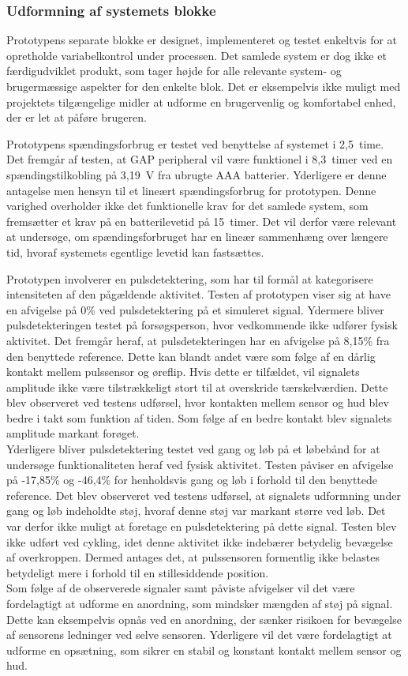 \subsubsection{Udformning af systemets blokke}
Prototypens separate blokke er designet, implementeret og testet enkeltvis for at opretholde variabelkontrol under processen. Det samlede system er dog ikke et færdigudviklet produkt, som tager højde for alle relevante system- og brugermæssige aspekter for den enkelte blok. Det er eksempelvis ikke muligt med projektets tilgængelige midler at udforme en brugervenlig og komfortabel enhed, der er let at påføre brugeren.

Prototypens spændingsforbrug er testet ved benyttelse af systemet i 2,5~time. Det fremgår af testen, at GAP peripheral vil være funktionel i 8,3~timer ved en spændingstilkobling på 3,19~V fra ubrugte AAA batterier. Yderligere er denne antagelse men hensyn til et lineært spændingsforbrug for prototypen. Denne varighed overholder ikke det funktionelle krav for det samlede system, som fremsætter et krav på en batterilevetid på 15~timer. Det vil derfor være relevant at undersøge, om spændingsforbruget har en lineær sammenhæng over længere tid, hvoraf systemets egentlige levetid kan fastsættes. 

Prototypen involverer en pulsdetektering, som har til formål at kategorisere intensiteten af den pågældende aktivitet. Testen af prototypen viser sig at have en afvigelse på 0\% ved pulsdetektering på et simuleret signal. Ydermere bliver pulsdetekteringen testet på forsøgsperson, hvor vedkommende ikke udfører fysisk aktivitet. Det fremgår heraf, at pulsdetekteringen har en afvigelse på 8,15\% fra den benyttede reference. Dette kan blandt andet være som følge af en dårlig kontakt mellem pulssensor og øreflip. Hvis dette er tilfældet, vil signalets amplitude ikke være tilstrækkeligt stort til at overskride tærskelværdien. Dette blev observeret ved testens udførsel, hvor kontakten mellem sensor og hud blev bedre i takt som funktion af tiden. Som følge af en bedre kontakt blev signalets amplitude markant forøget. \\
Yderligere bliver pulsdetektering testet ved gang og løb på et løbebånd for at undersøge funktionaliteten heraf ved fysisk aktivitet. Testen påviser en afvigelse på -17,85\% og -46,4\% for henholdsvis gang og løb i forhold til den benyttede reference. Det blev observeret ved testens udførsel, at signalets udformning under gang og løb indeholdte støj, hvoraf denne støj var markant større ved løb. Det var derfor ikke muligt at foretage en pulsdetektering på dette signal. Testen blev ikke udført ved cykling, idet denne aktivitet ikke indebærer betydelig bevægelse af overkroppen. Dermed antages det, at pulssensoren formentlig ikke belastes betydeligt mere i forhold til en stillesiddende position. \\
Som følge af de observerede signaler samt påviste afvigelser vil det være fordelagtigt at udforme en anordning, som mindsker mængden af støj på signal. Dette kan eksempelvis opnås ved en anordning, der sænker risikoen for bevægelse af sensorens ledninger ved selve sensoren. Yderligere vil det være fordelagtigt at udforme en opsætning, som sikrer en stabil og konstant kontakt mellem sensor og hud. 

